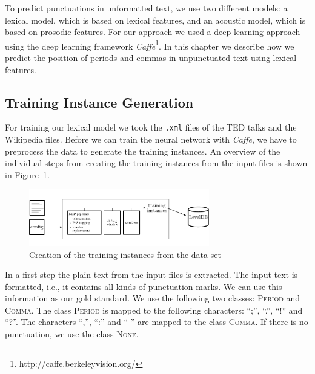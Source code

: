 To predict punctuations in unformatted text, we use two different models: a lexical model, which is based on lexical features, and an acoustic model, which is based on prosodic features.
For our approach we used a deep learning approach using the deep learning framework \emph{Caffe}\footnote{http://caffe.berkeleyvision.org/}.
In this chapter we describe how we predict the position of periods and commas in unpunctuated text using lexical features.

\subsection{Training Instance Generation}
For training our lexical model we took the \texttt{.xml} files of the TED talks and the Wikipedia files.
Before we can train the neural network with \emph{Caffe}, we have to preprocess the data to generate the training instances.
An overview of the individual steps from creating the training instances from the input files is shown in Figure~\ref{fig:overview_lexical}.

\begin{figure}[ht]
    \centering
    \includegraphics[width=0.7\textwidth]{img/overview_lexical.pdf}
    \caption{Creation of the training instances from the data set}
    \label{fig:overview_lexical}
\end{figure}

In a first step the plain text from the input files is extracted.
The input text is formatted, i.e., it contains all kinds of punctuation marks.
We can use this information as our gold standard.
We use the following two classes: \textsc{Period} and \textsc{Comma}.
The class \textsc{Period} is mapped to the following characters: ``;'', ``.'', ``!'' and ``?''.
The characters ``,'', ``:'' and ``-'' are mapped to the class \textsc{Comma}.
If there is no punctuation, we use the class \textsc{None}.


